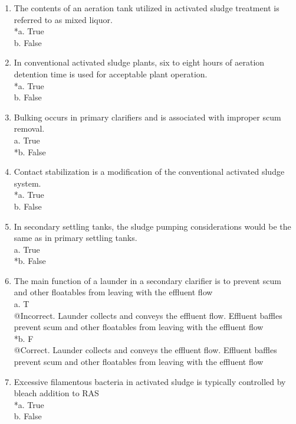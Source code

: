 \begin{enumerate}
\item  The contents of an aeration tank utilized in activated sludge treatment is referred to as mixed liquor. \\
*a. True \\
b. False \\

\item  In conventional activated sludge plants, six to eight hours of aeration detention time is used for acceptable plant operation. \\
*a. True \\
b. False \\

\item  Bulking occurs in primary clarifiers and is associated with improper scum removal. \\
a. True \\
*b. False \\

\item  Contact stabilization is a modification of the conventional activated sludge system. \\
*a. True \\
b. False \\

\item  In secondary settling tanks, the sludge pumping considerations would be the same as in primary settling tanks. \\
a. True \\
*b. False \\

\item  The main function of a launder in a secondary clarifier is to prevent scum and other floatables from leaving with the effluent flow \\
a. T\\
@Incorrect.  Launder collects and conveys the effluent flow.  Effluent baffles prevent scum and other floatables from leaving with the effluent flow \\
*b. F\\
@Correct.  Launder collects and conveys the effluent flow.  Effluent baffles prevent scum and other floatables from leaving with the effluent flow \\

\item  Excessive filamentous bacteria in activated sludge is typically controlled by bleach addition to RAS \\
*a. True \\
b. False \\


\end{enumerate}

